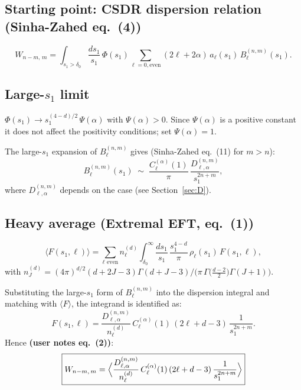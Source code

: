 \documentclass{article}
\begin{document}
\subsection{Starting point: CSDR dispersion relation (Sinha-Zahed eq.~(4))}

\[
  W_{n-m,\,m}
  = \int_{s_1>\delta_0} \frac{ds_1}{s_1}\,\Phi(s_1)
    \sum_{\ell=0,\text{even}} (2\ell+2\alpha)\,a_\ell(s_1)\,B_\ell^{(n,m)}(s_1).
\]

\subsection{Large-$s_1$ limit}

$\Phi(s_1) \to s_1^{(4-d)/2}\,\Psi(\alpha)$ with $\Psi(\alpha) > 0$.
Since $\Psi(\alpha)$ is a positive constant it does not affect the positivity
conditions; set $\Psi(\alpha)=1$.

The large-$s_1$ expansion of $B_\ell^{(n,m)}$ gives (Sinha-Zahed eq.~(11) for $m>n$):
\[
  B_\ell^{(n,m)}(s_1) \;\sim\; \frac{C_\ell^{(\alpha)}(1)}{\pi}\,
  \frac{D_{\ell,\alpha}^{(n,m)}}{s_1^{2n+m}},
\]
where $D_{\ell,\alpha}^{(n,m)}$ depends on the case (see Section~\ref{sec:D}).

\subsection{Heavy average (Extremal EFT, eq.~(1))}

\begin{equation}\label{eq:avg}
  \langle F(s_1, \ell) \rangle
  = \sum_{\ell\text{ even}} n_\ell^{(d)}\int_{\delta_0}^{\infty}\frac{ds_1}{s_1}\,
    \frac{s_1^{4-d}}{\pi}\,\rho_\ell(s_1)\,F(s_1,\ell),
\end{equation}
with $n_J^{(d)} = (4\pi)^{d/2}(d+2J-3)\Gamma(d+J-3)/\bigl(\pi\,\Gamma\!\bigl(\tfrac{d-2}{2}\bigr)\Gamma(J+1)\bigr)$.

Substituting the large-$s_1$ form of $B_\ell^{(n,m)}$ into the dispersion integral
and matching with $\langle F\rangle$, the integrand is identified as:
\[
  F(s_1,\ell) = \frac{D_{\ell,\alpha}^{(n,m)}}{n_\ell^{(d)}}\,
                C_\ell^{(\alpha)}(1)\,(2\ell+d-3)\,\frac{1}{s_1^{2n+m}}.
\]
Hence \textbf{(user notes eq.~(2))}:
\begin{equation}\label{eq:W_avg}
  \boxed{W_{n-m,\,m}
  = \Bigl\langle
      \frac{D_{\ell,\alpha}^{(n,m)}}{n_\ell^{(d)}}\,
      C_\ell^{(\alpha)}(1)\,(2\ell+d-3)\,
      \frac{1}{s_1^{2n+m}}
    \Bigr\rangle}
\end{equation}
\end{document}
